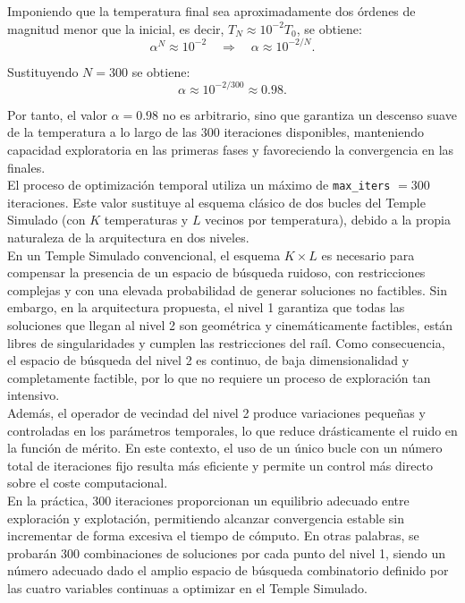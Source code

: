 Imponiendo que la temperatura final sea aproximadamente dos órdenes de magnitud
menor que la inicial, es decir, \(T_N \approx 10^{-2} T_0\), se obtiene:
\[
\alpha^N \approx 10^{-2}
\quad\Rightarrow\quad
\alpha \approx 10^{-2/N}.
\]

Sustituyendo \(N = 300\) se obtiene:
\[
\alpha \approx 10^{-2/300} \approx 0.98.
\]

Por tanto, el valor \(\alpha = 0.98\) no es arbitrario, sino que garantiza un
descenso suave de la temperatura a lo largo de las 300 iteraciones disponibles,
manteniendo capacidad exploratoria en las primeras fases y favoreciendo la
convergencia en las finales.\\

El proceso de optimización temporal utiliza un máximo de
\texttt{max\_iters} \(= 300\) iteraciones. Este valor sustituye al esquema
clásico de dos bucles del Temple Simulado (con \(K\) temperaturas y \(L\)
vecinos por temperatura), debido a la propia naturaleza de la arquitectura en
dos niveles. \\

En un Temple Simulado convencional, el esquema \(K \times L\) es necesario para
compensar la presencia de un espacio de búsqueda ruidoso, con restricciones
complejas y con una elevada probabilidad de generar soluciones no factibles.
Sin embargo, en la arquitectura propuesta, el nivel 1 garantiza que todas las
soluciones que llegan al nivel 2 son geométrica y cinemáticamente factibles,
están libres de singularidades y cumplen las restricciones del raíl. Como
consecuencia, el espacio de búsqueda del nivel 2 es continuo, de baja
dimensionalidad y completamente factible, por lo que no requiere un proceso de
exploración tan intensivo. \\

Además, el operador de vecindad del nivel 2 produce variaciones pequeñas y
controladas en los parámetros temporales, lo que reduce drásticamente el ruido
en la función de mérito. En este contexto, el uso de un único bucle con un
número total de iteraciones fijo resulta más eficiente y permite un control más
directo sobre el coste computacional. \\

En la práctica, 300 iteraciones proporcionan un equilibrio adecuado entre
exploración y explotación, permitiendo alcanzar convergencia estable sin
incrementar de forma excesiva el tiempo de cómputo. En otras palabras, 
se probarán 300 combinaciones de soluciones por cada punto del nivel 1, siendo un 
número adecuado dado el amplio espacio de búsqueda combinatorio definido 
por las cuatro variables continuas a optimizar en el Temple Simulado.

